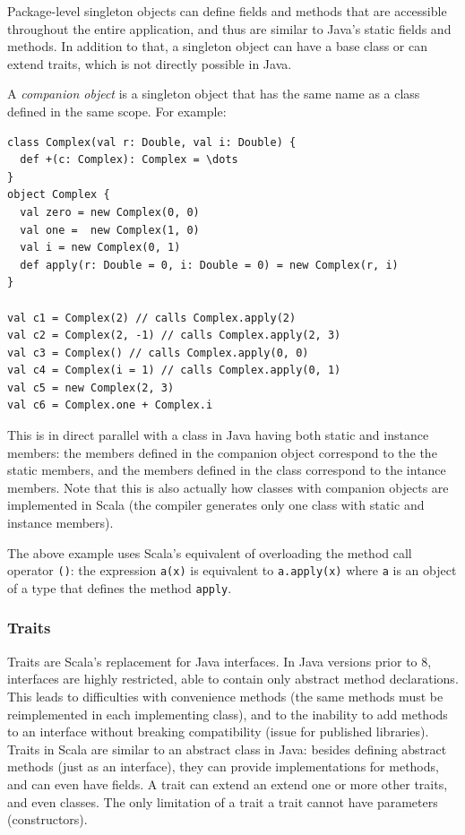 Package-level singleton objects can define fields and methods that are accessible throughout the entire application, and thus are similar to Java's static fields and methods. In addition to that, a singleton object can have a base class or can extend traits, which is not directly possible in Java.

A \emph{companion object} is a singleton object that has the same name as a class defined in the same scope. For example:

\begin{lstlisting}
class Complex(val r: Double, val i: Double) {
  def +(c: Complex): Complex = \dots
}
object Complex {
  val zero = new Complex(0, 0)
  val one =  new Complex(1, 0)
  val i = new Complex(0, 1)
  def apply(r: Double = 0, i: Double = 0) = new Complex(r, i)
}

val c1 = Complex(2) // calls Complex.apply(2)
val c2 = Complex(2, -1) // calls Complex.apply(2, 3)
val c3 = Complex() // calls Complex.apply(0, 0)
val c4 = Complex(i = 1) // calls Complex.apply(0, 1)
val c5 = new Complex(2, 3)
val c6 = Complex.one + Complex.i
\end{lstlisting}

This is in direct parallel with a class in Java having both static and instance members: the members defined in the companion object correspond to the the static members, and the members defined in the class correspond to the intance members. Note that this is also actually how classes with companion objects are implemented in Scala (the compiler generates only one class with static and instance members).

The above example uses Scala's equivalent of overloading the method call operator \texttt{()}: the expression \texttt{a(x)} is equivalent to \texttt{a.apply(x)} where \texttt{a} is an object of a type that defines the method \texttt{apply}.

\subsubsection{Traits}

Traits are Scala's replacement for Java interfaces. In Java versions prior to 8, interfaces are highly restricted, able to contain only abstract method declarations. This leads to difficulties with convenience methods (the same methods must be reimplemented in each implementing class), and to the inability to add methods to an interface without breaking compatibility (issue for published libraries). Traits in Scala are similar to an abstract class in Java: besides defining abstract methods (just as an interface), they can provide implementations for methods, and can even have fields. A trait can extend an extend one or more other traits, and even classes. The only limitation of a trait a trait cannot have parameters (constructors).

